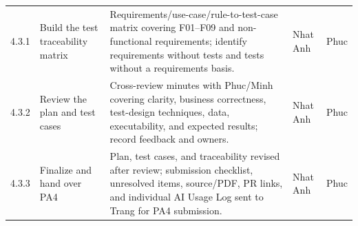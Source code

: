 \documentclass[11pt]{article}
\renewcommand{\arraystretch}{1.18}
\begin{document}
\begin{longtable}{@{}L{1.15cm}L{3.2cm}L{7.6cm}L{1.4cm}L{1.4cm}@{}}
4.3.1 & Build the test traceability matrix & Requirements/use-case/rule-to-test-case matrix covering F01--F09 and non-functional requirements; identify requirements without tests and tests without a requirements basis. & Nhat Anh & Phuc \\
4.3.2 & Review the plan and test cases & Cross-review minutes with Phuc/Minh covering clarity, business correctness, test-design techniques, data, executability, and expected results; record feedback and owners. & Nhat Anh & Phuc \\
4.3.3 & Finalize and hand over PA4 & Plan, test cases, and traceability revised after review; submission checklist, unresolved items, source/PDF, PR links, and individual AI Usage Log sent to Trang for PA4 submission. & Nhat Anh & Phuc \\
\bottomrule\end{longtable}\normalsize\setlength{\tabcolsep}{3pt}\renewcommand{\arraystretch}{1.18}
\end{document}
